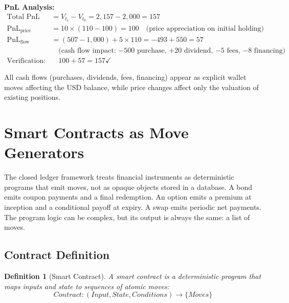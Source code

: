 \documentclass[11pt,a4paper]{article}
\newtheorem{definition}{Definition}[section]
\begin{document}
\noindent\textbf{PnL Analysis:}
\begin{align*}
\text{Total PnL} &= V_{t_1} - V_{t_0} = 2{,}157 - 2{,}000 = 157 \\
\text{PnL}_{\text{price}} &= 10 \times (110 - 100) = 100 \quad \text{(price appreciation on initial holding)} \\
\text{PnL}_{\text{flow}} &= (507 - 1{,}000) + 5 \times 110 = -493 + 550 = 57 \\
&\quad\text{(cash flow impact: $-500$ purchase, $+20$ dividend, $-5$ fees, $-8$ financing)} \\
\text{Verification:} &\quad 100 + 57 = 157 \checkmark
\end{align*}

All cash flows (purchases, dividends, fees, financing) appear as explicit wallet moves affecting the USD balance, while price changes affect only the valuation of existing positions.

\clearpage
\section{Smart Contracts as Move Generators}
\label{sec:contracts}

The closed ledger framework treats financial instruments as deterministic programs that emit moves, not as opaque objects stored in a database. A bond emits coupon payments and a final redemption. An option emits a premium at inception and a conditional payoff at expiry. A swap emits periodic net payments. The program logic can be complex, but its output is always the same: a list of moves.

\subsection{Contract Definition}

\begin{definition}[Smart Contract]
A smart contract is a deterministic program that maps inputs and state to sequences of atomic moves:
\[
\textit{Contract} : (\textit{Input}, \textit{State}, \textit{Conditions}) \to \{\textit{Moves}\}
\]
\end{definition}
\end{document}
